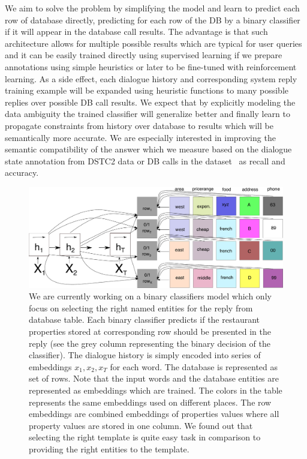 \documentclass[11pt]{article}
\begin{document}
We aim to solve the problem by simplifying the model and learn to predict each row of database directly, predicting for each row of the DB by a binary classifier if it will appear in the database call results. 
The advantage is that such architecture allows for multiple possible results which are typical for user queries and it can be easily trained directly using supervised learning if we prepare annotations using simple heuristics or later to be fine-tuned with reinforcement learning.
As a side effect, each dialogue history and corresponding system reply training example will be expanded using heuristic functions to many possible replies over possible DB call results.
We expect that by explicitly modeling the data ambiguity the trained classifier will generalize better and finally learn to propagate constraints from history over database to results which will be semantically more accurate.
We are especially interested in improving the semantic compatibility of the answer which we measure based on the dialogue state annotation from DSTC2 data or DB calls in the dataset~\cite{platek2016wochat} as recall and accuracy.
\begin{figure}[ht]
    \centering
    \includegraphics[width=1.0\linewidth]{e2end_dbclassifiers}
    \caption{We are currently working on a binary classifiers model which only focus on selecting the right named entities for the reply from database table. 
    Each binary classifier predicts if the restaurant properties stored at corresponding row should be presented in the reply (see the grey column representing the binary decision of the classifier). 
    The dialogue history is simply encoded into series of embeddings $x_1, x_2, x_T$ for each word.
    The database is represented as set of rows.
    Note that the input words and the database entities are represented as embeddings which are trained. 
    The colors in the table represents the same embeddings used on different places.
    The row embeddings are combined embeddings of properties values where all property values are stored in one column.
    We found out that selecting the right template is quite easy task in comparison to providing the right entities to the template.
    }
\label{fig:e2end_entities}
\end{figure}
\end{document}
